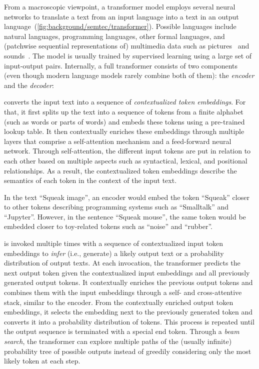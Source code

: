 From a macroscopic viewpoint, a transformer model employs several neural networks to translate a text from an input language into a text in an output language~(\cref{fig:background/semtec/transformer}).
Possible languages include natural languages, programming languages, other formal languages, and (patchwise sequential representations of) multimedia data such as pictures~\cite{dosovitskiy2021image} and sounds~\cite{gong2021ast}.
The model is usually trained by supervised learning using a large set of input-output pairs.
Internally, a full transformer consists of two components (even though modern language models rarely combine both of them): the \emph{encoder} and the \emph{decoder}:
%
\begin{description}[noextralabelsep]
	\item[The encoder] converts the input text into a sequence of \emph{contextualized token embeddings}.
	For that, it first splits up the text into a sequence of tokens from a finite alphabet (such as words or parts of words) and embeds these tokens using a pre-trained lookup table.
	It then contextually enriches these embeddings through multiple layers that comprise a self-attention mechanism and a feed-forward neural network.
	Through self-attention, the different input tokens are put in relation to each other based on multiple aspects such as syntactical, lexical, and positional relationships.
	As a result, the contextualized token embeddings describe the semantics of each token in the context of the input text.

	\begin{example}
		In the text ``Squeak image'', an encoder would embed the token ``Squeak'' closer to other tokens describing programming systems such as ``Smalltalk'' and ``Jupyter''.
		However, in the sentence ``Squeak mouse'', the same token would be embedded closer to toy-related tokens such as ``noise'' and ``rubber''.
	\end{example}

	\item[The decoder] is invoked multiple times with a sequence of contextualized input token embeddings to \emph{infer} (i.e., generate) a likely output text or a probability distribution of output texts.
	At each invocation, the transformer predicts the next output token given the contextualized input embeddings and all previously generated output tokens.
	It contextually enriches the previous output tokens and combines them with the input embeddings through a self- and cross-attentive stack, similar to the encoder.
	From the contextually enriched output token embeddings, it selects the embedding next to the previously generated token and converts it into a probability distribution of tokens.
	This process is repeated until the output sequence is terminated with a special end token.
	Through a \emph{beam search}, the transformer can explore multiple paths of the (usually infinite) probability tree of possible outputs instead of greedily considering only the most likely token at each step.


\end{description}
